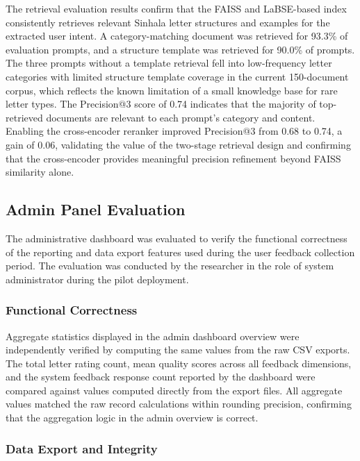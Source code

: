 \documentclass[12pt]{uomthesis}
\begin{document}
The retrieval evaluation results confirm that the FAISS and LaBSE-based index consistently retrieves relevant Sinhala letter structures and examples for the extracted user intent. A category-matching document was retrieved for 93.3\% of evaluation prompts, and a structure template was retrieved for 90.0\% of prompts. The three prompts without a template retrieval fell into low-frequency letter categories with limited structure template coverage in the current 150-document corpus, which reflects the known limitation of a small knowledge base for rare letter types. The Precision@3 score of 0.74 indicates that the majority of top-retrieved documents are relevant to each prompt's category and content. Enabling the cross-encoder reranker improved Precision@3 from 0.68 to 0.74, a gain of 0.06, validating the value of the two-stage retrieval design and confirming that the cross-encoder provides meaningful precision refinement beyond FAISS similarity alone.

\subsection{Admin Panel Evaluation}

The administrative dashboard was evaluated to verify the functional correctness of the reporting and data export features used during the user feedback collection period. The evaluation was conducted by the researcher in the role of system administrator during the pilot deployment.

\subsubsection{Functional Correctness}

Aggregate statistics displayed in the admin dashboard overview were independently verified by computing the same values from the raw CSV exports. The total letter rating count, mean quality scores across all feedback dimensions, and the system feedback response count reported by the dashboard were compared against values computed directly from the export files. All aggregate values matched the raw record calculations within rounding precision, confirming that the aggregation logic in the admin overview is correct.

\subsubsection{Data Export and Integrity}
\end{document}
